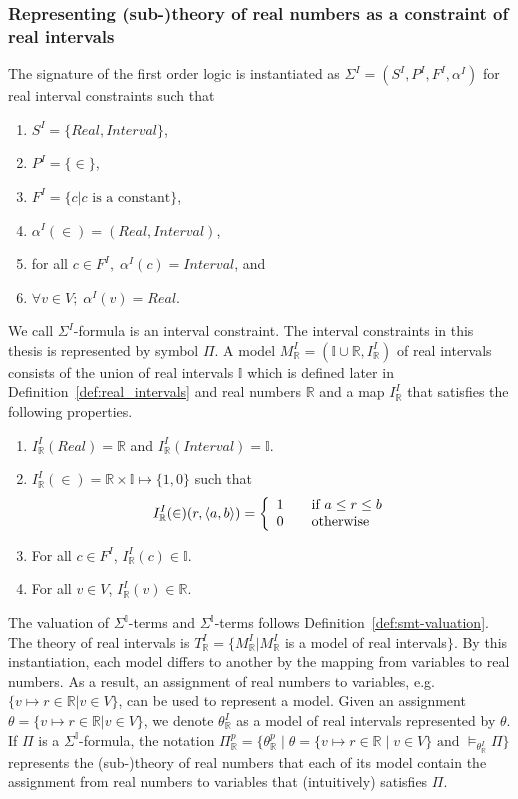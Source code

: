 \subsubsection*{Representing (sub-)theory of real numbers as a constraint of real intervals}
The signature of the first order logic is instantiated as $\Sigma^I = (S^I, P^I, F^I, \alpha^I)$ for real interval constraints such that
\begin{enumerate}
\item $S^I = \{Real, Interval\}$,
\item $P^I = \{\in\}$,
\item $F^I = \{c | c \text{ is a constant}\}$,
\item $\alpha^I(\in) = (Real, Interval)$,
\item for all $c \in F^I, \; \alpha^I(c) = Interval$, and 
\item $\forall v \in V; \; \alpha^I(v) = Real$.
\end{enumerate}
We call $\Sigma^I$-formula is an interval constraint. The interval constraints in this thesis is represented by symbol $\Pi$.
A model $M^I_{\mathbb{R}} = (\mathbb{I} \cup \mathbb{R}, I^I_\mathbb{R})$ of real intervals consists of the union of real intervals $\mathbb{I}$ which is defined later in Definition~\ref{def:real_intervals} and real numbers $\mathbb{R}$ and a map $I^I_\mathbb{R}$ that satisfies the following properties.
\begin{enumerate}
\item $I^I_\mathbb{R}(Real) = \mathbb{R}$ and $I^I_\mathbb{R}(Interval) = \mathbb{I}$.
\item $I^I_\mathbb{R}(\in) = \mathbb{R} \times \mathbb{I} \mapsto \{1, 0\}$ such that \[I_\mathbb{R}^I(\in)(r, \langle a, b \rangle) = \left\{ 
  \begin{array}{c l}
    1 & \quad \text{if } a \le r \le b\\
    0 & \quad \text{otherwise }\\
  \end{array} \right.\]
\item For all $c \in F^I$, $I^I_\mathbb{R}(c) \in \mathbb{I}$.
\item For all $v \in V$, $I^I_\mathbb{R}(v) \in \mathbb{R}$.
\end{enumerate}
The valuation of $\Sigma^\mathbb{I}$-terms and $\Sigma^\mathbb{I}$-terms follows Definition~\ref{def:smt-valuation}. The theory of real intervals is $T^I_\mathbb{R} = \{M^I_\mathbb{R} | M^I_\mathbb{R}$ is a model of real intervals$\}$.
By this instantiation, each model differs to another by the mapping from variables to real numbers. As a result, an assignment of real numbers to variables, e.g. $\{v \mapsto r \in \mathbb{R} | v \in V\}$, can be used to represent a model. Given an assignment $\theta = \{v \mapsto r \in \mathbb{R} | v \in V\}$, we denote $\theta^I_\mathbb{R}$ as a model of real intervals represented by $\theta$. If $\Pi$ is a $\Sigma^\mathbb{I}$-formula, the notation ${\Pi^p_\mathbb{R} = \{\theta^p_\mathbb{R} \mid \theta = \{v \mapsto r \in \mathbb{R} \mid v \in V\} \text{ and } \models_{\theta^I_\mathbb{R}} \Pi \}}$ represents the (sub-)theory of real numbers that each of its model contain the assignment from real numbers to variables that (intuitively) satisfies $\Pi$.



